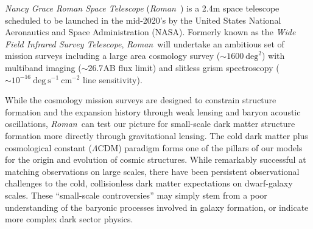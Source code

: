\documentclass[11pt]{article}
\newcommand{\RST}{\emph{Roman}~}
\begin{document}
\clearpage


\emph{Nancy Grace Roman Space Telescope} (\RST) is a 2.4m space telescope scheduled 
to be launched in the
mid-2020's by the United States National Aeronautics and Space Administration (NASA)\citep{spergel2015a,akeson2019a}.
Formerly known as the \emph{Wide Field Infrared Survey Telescope}, \RST will undertake
an ambitious set of mission surveys including a large area cosmology survey ($\sim 1600~\mathrm{deg}^2$)
with multiband imaging ($\sim26.7$AB flux limit) and slitless grism spectroscopy ($\sim10^{-16}~\mathrm{deg}~\mathrm{s}^{-1}~\mathrm{cm}^{-2}$ line sensitivity).

While the cosmology mission surveys are designed to constrain structure formation and the
expansion history through weak lensing and baryon acoustic oscillations, 
\RST can test our picture for small-scale dark matter structure formation more
directly through gravitational lensing. The cold dark matter plus cosmological constant ($\Lambda$CDM)
paradigm forms one of the pillars of our models for the origin and evolution of cosmic structures.
While remarkably successful at matching observations on large scales, there have been persistent
observational challenges to the cold, collisionless dark matter expectations on dwarf-galaxy
scales. These “small-scale controversies” may simply stem from a poor understanding of the
baryonic processes involved in galaxy formation, or indicate more complex dark sector physics\citep{bullock2017a}.
\end{document}
